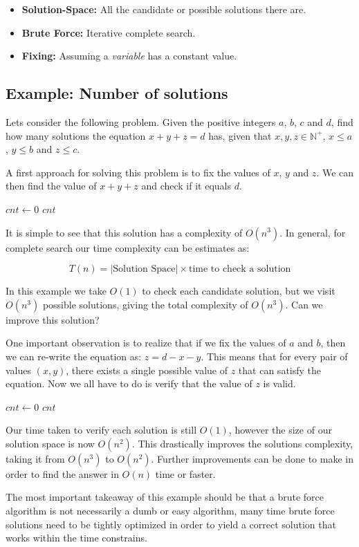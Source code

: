 \documentclass{article}
\begin{document}
\begin{itemize}
	\item \textbf{Solution-Space:} All the candidate or possible solutions there are.
	\item \textbf{Brute Force:} Iterative complete search.
	\item \textbf{Fixing:} Assuming a \textit{variable} has a constant value.
\end{itemize}

\subsection{Example: Number of solutions}

Lets consider the following problem. Given the positive integers $a$, $b$, $c$ and $d$, find how many solutions the equation $x + y + z = d$ has, given that $x, y, z \in \mathbb{N}^+$, $x \leq a$, $y \leq b$ and $z \leq c$.

A first approach for solving this problem is to fix the values of $x$, $y$ and $z$. We can then find the value of $x + y + z$ and check if it equals $d$.

\begin{algorithm}
	\SetAlgoNoEnd
	$cnt \gets 0$\;
	\Return $cnt$\;
\end{algorithm}

It is simple to see that this solution has a complexity of $O(n^3)$. In general, for complete search our time complexity can be estimates as:

$$T(n) = |\text{Solution Space}| \times \text{time to check a solution}$$

In this example we take $O(1)$ to check each candidate solution, but we visit $O(n^3)$ possible solutions, giving the total complexity of $O(n^3)$. Can we improve this solution?

One important observation is to realize that if we fix the values of $a$ and $b$, then we can re-write the equation as: $z = d - x - y$. This means that for every pair of values $(x, y)$, there exists a single possible value of $z$ that can satisfy the equation. Now we all have to do is verify that the value of $z$ is valid.

\begin{algorithm}
	\SetAlgoNoEnd
	$cnt \gets 0$\;
	\Return $cnt$\;
\end{algorithm}

Our time taken to verify each solution is still $O(1)$, however the size of our solution space is now $O(n^2)$. This drastically improves the solutions complexity, taking it from $O(n^3)$ to $O(n^2)$. Further improvements can be done to make in order to find the answer in $O(n)$ time or faster.

The most important takeaway of this example should be that a brute force algorithm is not necessarily a dumb or easy algorithm, many time brute force solutions need to be tightly optimized in order to yield a correct solution that works within the time constrains.
\end{document}
